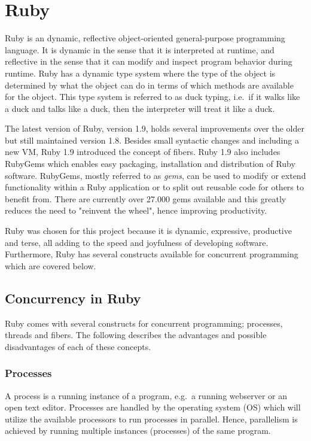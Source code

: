 \section{Ruby} %
\label{sec:ruby}

Ruby is an dynamic, reflective object-oriented general-purpose programming
language. It is dynamic in the sense that it is interpreted at runtime, and
reflective in the sense that it can modify and inspect program behavior during
runtime.  Ruby has a dynamic type system where the type of the object is
determined by what the object can do in terms of which methods are available
for the object. This type system is referred to as duck typing, i.e.\ if it
walks like a duck and talks like a duck, then the interpreter will treat it
like a duck.

The latest version of Ruby, version 1.9, holds several improvements over the
older but still maintained version 1.8. Besides small syntactic changes and
including a new VM, Ruby 1.9 introduced the concept of fibers. Ruby 1.9 also
includes RubyGems which enables easy packaging, installation and distribution of
Ruby software. RubyGems, mostly referred to as \textit{gems}, can be used to
modify or extend functionality within a Ruby application or to split out
reusable code for others to benefit from. There are currently over 27.000 gems
available and this greatly reduces the need to "reinvent the wheel", hence
improving productivity. 

Ruby was chosen for this project because it is dynamic, expressive, productive
and terse, all adding to the speed and joyfulness of developing software.
Furthermore, Ruby has several constructs available for concurrent programming
which are covered below.

\subsection{Concurrency in Ruby}
Ruby comes with several constructs for concurrent programming; processes, threads
and fibers. The following describes the advantages and possible disadvantages
of each of these concepts.

\subsubsection{Processes}
A process is a running instance of a program, e.g.\ a running webserver or an
open text editor. Processes are handled by the operating system (OS) which
will utilize the available processors to run processes in parallel.
Hence, parallelism is achieved by running multiple instances (processes) of
the same program.

